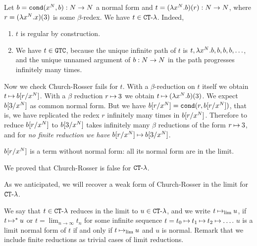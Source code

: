 \begin{Eg}
Let $b = {\tt cond}(x^{{N}},b):{N} \rightarrow {N}$ a normal form
and $t = (\lambda x^{{N}}.b)(r):{N} \rightarrow {N}$, 
where $r = (\lambda x^{{N}}.x)(3)$ is some $\beta$-redex. 
We have $t \in { {\tt CT} \mbox{-} \lambda}$. Indeed, 
\begin{enumerate}
\item
$t$ is regular by construction.
\item
We have $t \in {\tt GTC}$, because the unique infinite path of $t$ is 
$t, \lambda x^{{N}}.b, b, b, b, \ldots$, and the
unique unnamed argument of $b:{N} \rightarrow {N}$ in the path progresses infinitely many times.
\end{enumerate}

Now we check Church-Rosser fails for $t$.
With a $\beta$-reduction on $t$ itself we obtain $t \mathbin{\mapsto} b[r/x^{N}]$.
With a $\beta$ reduction $r \mathbin{\mapsto} 3$ we obtain $t \mathbin{\mapsto}  (\lambda x^{{N}}.b)(3)$.
We expect $b[3/x^{N}]$ as common normal form. But we have $b[r/x^{N}] = {\tt cond}(r,b[r/x^{N}])$,
that is, we have replicated the redex $r$ infinitely many times in $b[r/x^{N}]$. Therefore to reduce 
$b[r/x^{N}]$ to $b[3/x^{N}]$ takes infinitely many $\beta$ reductions of the form $r \mathbin{\mapsto} 3$, 
and for \emph{no finite reduction we have} $b[r/x^{N}] \mathbin{\mapsto} b[3/x^{N}]$. 

$b[r/x^{N}]$ is a term without normal form: all its normal form are in the limit.

We proved that Church-Rosser is false for ${ {\tt CT} \mbox{-} \lambda}$.
\end{Eg}

As we anticipated, we will recover a weak form of Church-Rosser in the limit for ${ {\tt CT} \mbox{-} \lambda}$.

We say that $t \in { {\tt CT} \mbox{-} \lambda}$ reduces in the limit to $u \in { {\tt CT} \mbox{-} \lambda}$, and we write 
$t \mathbin{\mapsto}_{\lim} u$, if $t \mathbin{\mapsto}^* u$ 
or $t = \lim_{n \rightarrow \infty} t_n$ for some infinite sequence $t = t_0 \mathbin{\mapsto} t_1 \mathbin{\mapsto} t_2
\mathbin{\mapsto} \ldots$. $u$ is a limit normal form of $t$ if and only if $t \mathbin{\mapsto}_{\lim} u$ and $u$ is normal.
Remark that we include finite reductions as trivial cases of limit reductions.

